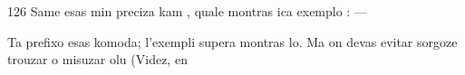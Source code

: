 \begin{VUpage}[130]{126}
Same  esas min preciza kam , quale montras\nl
ica exemplo :  --- \nl
{}

Ta prefixo esas komoda; l'exempli supera montras lo. Ma\nl
on devas evitar sorgoze trouzar o misuzar olu (Videz, en\parplein
\end{VUpage}

